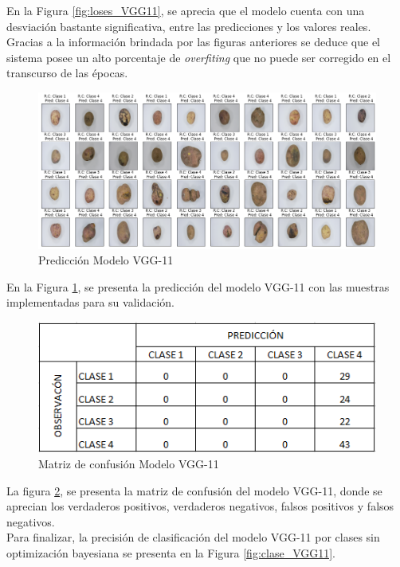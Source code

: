 			En la Figura \ref{fig:loses_VGG11}, se aprecia que el modelo cuenta con una desviación bastante significativa, entre las predicciones y los valores reales. Gracias a la información brindada por las figuras anteriores se deduce que el sistema posee un alto porcentaje de \textit{overfiting} que no puede ser corregido en el transcurso de las épocas.
			
			\newpage
			\begin{figure}[ht]
				\centering
				\includegraphics[scale=0.35]{Figs/107.png}
				\caption{Predicción Modelo VGG-11}
				\label{fig:Pre_VGG11}
			\end{figure}
			
			En la Figura \ref{fig:Pre_VGG11}, se presenta la predicción del modelo VGG-11 con las muestras implementadas para su validación.
			
			\begin{figure}[ht]
				\centering
				\includegraphics[scale=0.55]{Figs/51.png}
				\caption{Matriz de confusión Modelo VGG-11}
				\label{fig:MC_VGG11}
			\end{figure}
			
			La figura \ref{fig:MC_VGG11}, se presenta la matriz de confusión del modelo VGG-11, donde se aprecian los verdaderos positivos, verdaderos negativos, falsos positivos y falsos negativos.
			\\
			Para finalizar, la precisión de clasificación del modelo VGG-11 por clases sin optimización bayesiana se presenta en la Figura \ref{fig:clase_VGG11}.  
			
